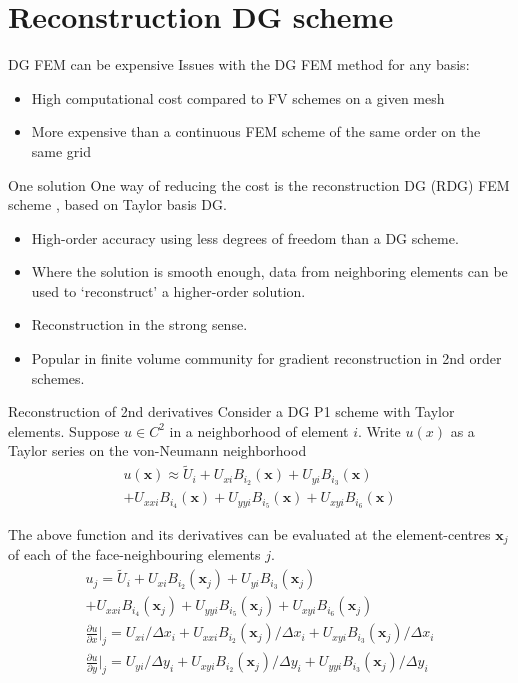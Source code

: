 \documentclass[11pt]{beamer}
\let\bld\boldsymbol
\begin{document}
\section{Reconstruction DG scheme}
\begin{frame}{DG FEM can be expensive}
Issues with the DG FEM method for any basis: 
\begin{itemize}
	\item High computational cost compared to FV schemes on a given mesh
	\item More expensive than a continuous FEM scheme of the same order on the same grid
\end{itemize}
\end{frame}
\begin{frame}{One solution}
One way of reducing the cost is the reconstruction DG (RDG) FEM scheme \cite{luo_rdg}, based on Taylor basis DG. 
\begin{itemize}
\item High-order accuracy using less degrees of freedom than a DG scheme. 
\item Where the solution is smooth enough, data from neighboring elements can be used to `reconstruct' a higher-order solution. 
\item Reconstruction in the strong sense.
\item Popular in finite volume community for gradient reconstruction in 2nd order schemes.
\end{itemize}
\end{frame}
\begin{frame}{Reconstruction of 2nd derivatives}
Consider a DG P1 scheme with Taylor elements. Suppose $u \in C^2$ in a neighborhood of element $i$. Write $u(x)$ as a Taylor series on the von-Neumann neighborhood
\begin{multline}
u(\bld{x}) \approx \tilde{U}_i + U_{xi}B_{i_2}(\bld{x}) + U_{yi}B_{i_3}(\bld{x}) \\+ U_{xxi} B_{i_4}(\bld{x}) + U_{yyi} B_{i_5}(\bld{x}) + U_{xyi} B_{i_6}(\bld{x})
\end{multline}
\end{frame}
\begin{frame}
The above function and its derivatives can be evaluated at the element-centres $\bld{x}_j$ of each of the face-neighbouring elements $j$.
\begin{multline}
u_j = \tilde{U}_i + U_{xi}B_{i_2}(\bld{x}_j) + U_{yi}B_{i_3}(\bld{x}_j) \\+ U_{xxi} B_{i_4}(\bld{x}_j) + U_{yyi} B_{i_5}(\bld{x}_j) + U_{xyi} B_{i_6}(\bld{x}_j) \\
\frac{\partial u}{\partial x}\Big|_j = U_{xi}/\Delta x_i + U_{xxi} B_{i_2}(\bld{x}_j) / \Delta x_i + U_{xyi} B_{i_3}(\bld{x}_j) /\Delta x_i \\
\frac{\partial u}{\partial y}\Big|_j = U_{yi}/\Delta y_i + U_{xyi} B_{i_2}(\bld{x}_j) / \Delta y_i + U_{yyi}B_{i_3}(\bld{x}_j)/\Delta y_i
\end{multline}
\end{frame}
\end{document}
